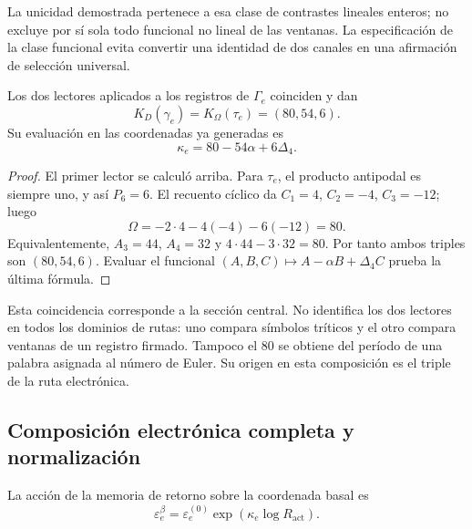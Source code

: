 La unicidad demostrada pertenece a esa clase de contrastes lineales
enteros; no excluye por sí sola todo funcional no lineal de las ventanas.
La especificación de la clase funcional evita convertir una identidad
de dos canales en una afirmación de selección universal.

\begin{theorem}
Los dos lectores aplicados a los registros de \(\Gamma_e\)
coinciden y dan
\begin{equation}
 K_D(\gamma_e)=K_\Omega(\tau_e)=(80,54,6).
 \label{eq:el-triple}
\end{equation}
Su evaluación en las coordenadas ya generadas es
\begin{equation}
 \kappa_e=80-54\alpha+6\Delta_4.
 \label{eq:el-kappa}
\end{equation}
\end{theorem}
\begin{proof}
El primer lector se calculó arriba. Para \(\tau_e\), el producto
antipodal es siempre uno, y así \(P_6=6\). El recuento cíclico da
\(C_1=4\), \(C_2=-4\), \(C_3=-12\); luego
\[
 \Omega=-2\cdot4-4(-4)-6(-12)=80.
\]
Equivalentemente, \(A_3=44\), \(A_4=32\) y
\(4\cdot44-3\cdot32=80\). Por tanto ambos triples son
\((80,54,6)\). Evaluar el funcional
\((A,B,C)\mapsto A-\alpha B+\Delta_4C\) prueba la última fórmula.
\end{proof}

Esta coincidencia corresponde a la sección central. No identifica los
dos lectores en todos los dominios de rutas: uno compara símbolos
tríticos y el otro compara ventanas de un registro firmado. Tampoco el
\(80\) se obtiene del período de una palabra asignada al número de
Euler. Su origen en esta composición es el triple de la ruta
electrónica.



\subsection{Composición electrónica completa y normalización}

\begin{definition}
La acción de la memoria de retorno sobre la coordenada basal es
\begin{equation}
 \varepsilon_e^\beta
 =\varepsilon_e^{(0)}\exp\!\left(\kappa_e\log R_{\mathrm{act}}\right).
 \label{eq:el-beta}
\end{equation}
\end{definition}

